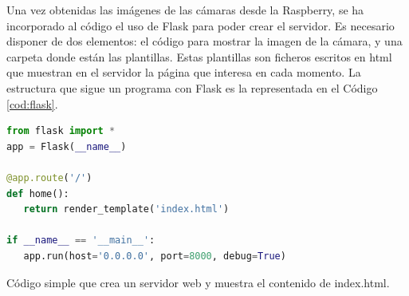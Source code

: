 Una vez obtenidas las imágenes de las cámaras desde la Raspberry, se ha incorporado al código el uso de Flask para poder crear el servidor. Es necesario disponer de dos elementos: el código para mostrar la imagen de la cámara, y una carpeta donde están las plantillas. Estas plantillas son ficheros escritos en html que muestran en el servidor la página que interesa en cada momento. La estructura que sigue un programa con Flask es la representada en el Código \ref{cod:flask}.\\
\begin{code}[h]
\begin{lstlisting}[language=Python]
from flask import *
app = Flask(__name__)

@app.route('/')
def home():
   return render_template('index.html')

if __name__ == '__main__':
   app.run(host='0.0.0.0', port=8000, debug=True)
\end{lstlisting}
\caption[Código simple que crea un servidor web en el puerto 8000 y muestra el contenido de index.html.]{Código simple que crea un servidor web y muestra el contenido de index.html.}
\label{cod:flask}
\end{code}

